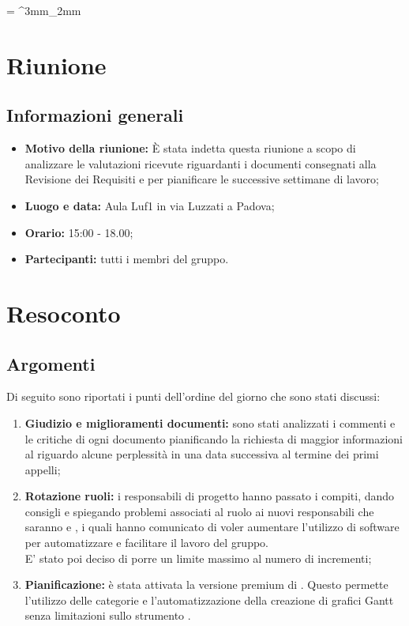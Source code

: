 \documentclass[VER-2018-01-29.tex]{subfiles}
\begin{document}
\tabulinesep = ^3mm_2mm
\chapter{Riunione}

\section{Informazioni generali}	
\begin{itemize}
	\item \textbf{Motivo della riunione:} \`{E} stata indetta questa riunione a scopo di analizzare le valutazioni ricevute riguardanti i documenti consegnati alla Revisione dei Requisiti e per pianificare le successive settimane di lavoro;
	\item \textbf{Luogo e data:} Aula Luf1 in via Luzzati a Padova;
	\item \textbf{Orario:} 15:00 - 18.00;
	\item \textbf{Partecipanti:} tutti i membri del gruppo.
\end{itemize}

\chapter{Resoconto}

\section{Argomenti}	
Di seguito sono riportati i punti dell'ordine del giorno che sono stati discussi:
\begin{enumerate}
	\item \textbf{Giudizio e miglioramenti documenti:} sono stati analizzati i commenti e le critiche di ogni documento pianificando la richiesta di maggior informazioni al \Vardanega riguardo alcune perplessità in una data successiva al termine dei primi appelli;
	
	\item \textbf{Rotazione ruoli:} i responsabili di progetto hanno passato i compiti, dando consigli e spiegando problemi associati al ruolo ai nuovi responsabili che saranno \Davide{} e \Riccardo{}, i quali hanno comunicato di voler aumentare l'utilizzo di software per automatizzare e facilitare il lavoro del gruppo. \\
	E' stato poi deciso di porre un limite massimo al numero di incrementi;
	
	\item \textbf{Pianificazione:} è stata attivata la versione premium di . Questo permette l'utilizzo delle categorie e l'automatizzazione della creazione di grafici Gantt senza limitazioni sullo strumento . 
	
	 
\end{enumerate} 
\end{document}
